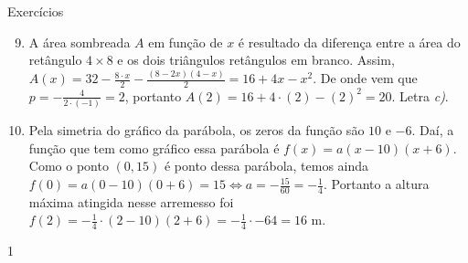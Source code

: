\clearmargin
\begin{answer}{Exercícios}
{\exerciselist
\begin{enumerate}\setcounter{enumi}{8}
\item A área sombreada \(A\) em função de \(x\) é resultado da diferença entre a área do retângulo \(4 \times 8\) e os dois triângulos retângulos em branco. Assim, \(A(x) = 32 - \frac{8 \cdot x}{2} - \frac{(8-2x)(4-x)}{2} = 16+4x-x^2\). De onde vem que \(p=-\frac{4}{2 \cdot (-1)} = 2\), portanto \(A(2)=16+4 \cdot (2) - (2)^2 = 20\). Letra \textit{c)}.


\item Pela simetria do gráfico da parábola, os zeros da função são \(10\) e \(-6\). Daí, a função que tem como gráfico essa parábola é \(f(x)=a(x-10)(x+6)\). Como o ponto \((0,15)\) é ponto dessa parábola, temos ainda \(f(0)=a(0-10)(0+6)=15 \Leftrightarrow a=-\frac{15}{60}=- \frac{1}{4}\). Portanto a altura máxima atingida nesse arremesso foi \(f(2)=- \frac{1}{4} \cdot (2-10)(2+6) = - \frac{1}{4} \cdot -64 = 16\) m.
\end{enumerate}
}{1}
\end{answer}
\clearmargin
